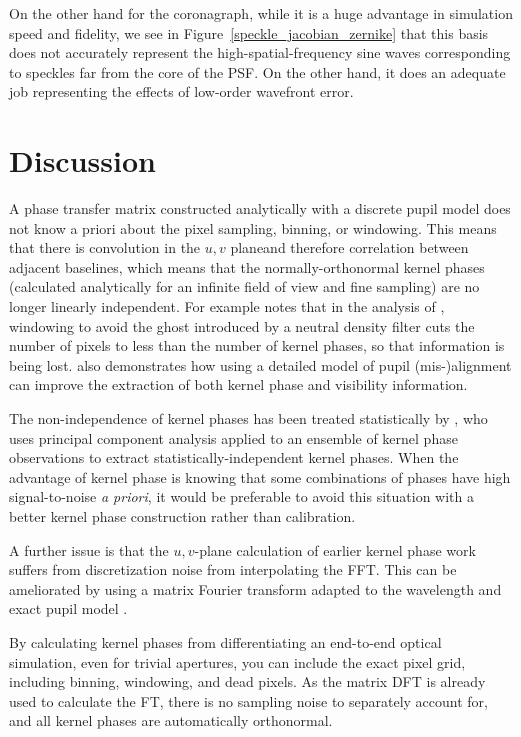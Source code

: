 \documentclass[modern]{aastex63}
\begin{document}
On the other hand for the coronagraph, while it is a huge advantage in simulation speed and fidelity, we see in Figure~\ref{speckle_jacobian_zernike} that this basis does not accurately represent the high-spatial-frequency sine waves corresponding to speckles far from the core of the PSF. On the other hand, it does an adequate job representing the effects of low-order wavefront error. 

\section{Discussion}
\label{sec:discussion}

A phase transfer matrix constructed analytically with a discrete pupil model does not know a priori about the pixel sampling, binning, or windowing. This means that there is convolution in the $u,v$ planeand therefore correlation between adjacent baselines, which means that the normally-orthonormal kernel phases (calculated analytically for an infinite field of view and fine sampling) are no longer linearly independent. For example \citet{martinache20} notes that in the analysis of \citet{palomar}, windowing to avoid the ghost introduced by a neutral density filter cuts the number of pixels to less than the number of kernel phases, so that information is being lost. \citet{martinache20} also demonstrates how using a detailed model of pupil (mis-)alignment can improve the extraction of both kernel phase and visibility information.

The non-independence of kernel phases has been treated statistically by \citet{ireland13}, who uses principal component analysis applied to an ensemble of kernel phase observations to extract statistically-independent kernel phases. When the advantage of kernel phase is knowing that some combinations of phases have high signal-to-noise \textit{a priori}, it would be preferable to avoid this situation with a better kernel phase construction rather than calibration.

A further issue is that the $u,v$-plane calculation of earlier kernel phase work suffers from discretization noise from interpolating the FFT. This can be ameliorated by using a matrix Fourier transform adapted to the wavelength and exact pupil model \citep{martinache_habilitation}.

By calculating kernel phases from differentiating an end-to-end optical simulation, even for trivial apertures, you can include the exact pixel grid, including binning, windowing, and dead pixels. As the matrix DFT is already used to calculate the FT, there is no sampling noise to separately account for, and all kernel phases are automatically orthonormal.
\end{document}
